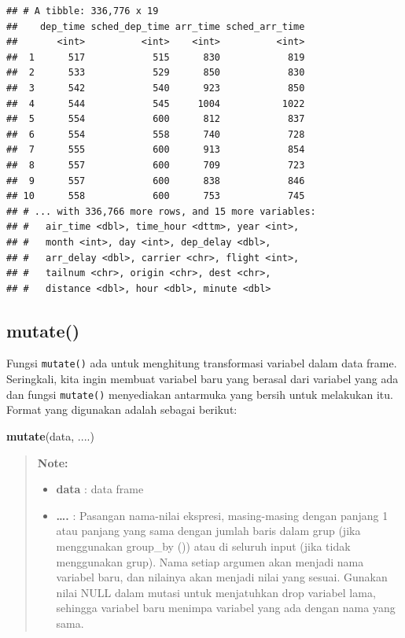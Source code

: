 \documentclass[]{book}
\newenvironment{Shaded}{\begin{snugshade}}{\end{snugshade}}
\newcommand{\KeywordTok}[1]{\textcolor[rgb]{0.13,0.29,0.53}{\textbf{#1}}}
\newcommand{\NormalTok}[1]{#1}
\providecommand{\tightlist}{%
  \setlength{\itemsep}{0pt}\setlength{\parskip}{0pt}}
\begin{document}
\begin{verbatim}
## # A tibble: 336,776 x 19
##    dep_time sched_dep_time arr_time sched_arr_time
##       <int>          <int>    <int>          <int>
##  1      517            515      830            819
##  2      533            529      850            830
##  3      542            540      923            850
##  4      544            545     1004           1022
##  5      554            600      812            837
##  6      554            558      740            728
##  7      555            600      913            854
##  8      557            600      709            723
##  9      557            600      838            846
## 10      558            600      753            745
## # ... with 336,766 more rows, and 15 more variables:
## #   air_time <dbl>, time_hour <dttm>, year <int>,
## #   month <int>, day <int>, dep_delay <dbl>,
## #   arr_delay <dbl>, carrier <chr>, flight <int>,
## #   tailnum <chr>, origin <chr>, dest <chr>,
## #   distance <dbl>, hour <dbl>, minute <dbl>
\end{verbatim}

\subsection{mutate()}\label{mutate}

Fungsi \texttt{mutate()} ada untuk menghitung transformasi variabel
dalam data frame. Seringkali, kita ingin membuat variabel baru yang
berasal dari variabel yang ada dan fungsi \texttt{mutate()} menyediakan
antarmuka yang bersih untuk melakukan itu. Format yang digunakan adalah
sebagai berikut:

\begin{Shaded}
\begin{Highlighting}[]
\KeywordTok{mutate}\NormalTok{(data, ....)}
\end{Highlighting}
\end{Shaded}

\begin{quote}
\textbf{Note: }

\begin{itemize}
\tightlist
\item
  \textbf{data} : data frame
\item
  \textbf{\ldots{}.} : Pasangan nama-nilai ekspresi, masing-masing
  dengan panjang 1 atau panjang yang sama dengan jumlah baris dalam grup
  (jika menggunakan group\_by ()) atau di seluruh input (jika tidak
  menggunakan grup). Nama setiap argumen akan menjadi nama variabel
  baru, dan nilainya akan menjadi nilai yang sesuai. Gunakan nilai NULL
  dalam mutasi untuk menjatuhkan drop variabel lama, sehingga variabel
  baru menimpa variabel yang ada dengan nama yang sama.
\end{itemize}
\end{quote}
\end{document}
